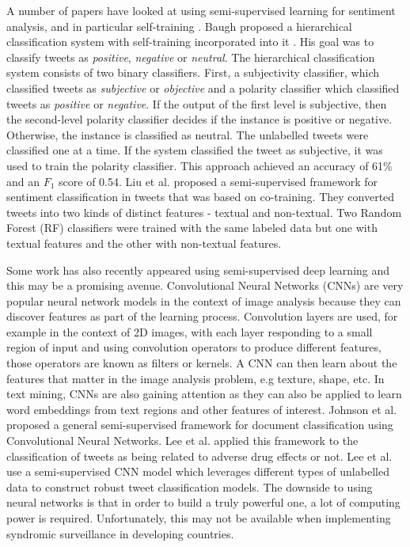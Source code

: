 \documentclass[10pt,letterpaper]{article}
\begin{document}
A number of papers have looked at using semi-supervised learning for sentiment analysis, and in particular self-training \cite{REF69, REF70}. Baugh \cite{REF71} proposed a hierarchical classification system with self-training incorporated into it . His goal was to classify tweets as \textit{positive}, \textit{negative} or \textit{neutral}. The hierarchical classification system consists of two binary classifiers. First, a subjectivity classifier, which classified tweets as \textit{subjective} or \textit{objective} and a polarity classifier which classified tweets as \textit{positive} or \textit{negative}. If the output of the first level is subjective, then the second-level polarity classifier decides if the instance is positive or negative. Otherwise, the instance is classified as neutral. The unlabelled tweets were classified one at a time. If the system classified the tweet as subjective, it was used to train the polarity classifier. This approach achieved an accuracy of 61\% and an $F_1$ score of 0.54. Liu et al.  \cite{REF72}  proposed a semi-supervised framework for sentiment classification in tweets that was based on co-training. They converted tweets into two kinds of distinct features - textual and non-textual. Two Random Forest (RF) classifiers were trained with the same labeled data but one with textual features and the other with non-textual features. 

Some work has also recently appeared using semi-supervised deep learning and this may be a promising avenue.  Convolutional Neural Networks (CNNs) \cite{REF84} are very popular neural network models in the context of image analysis because they can discover features as part of the learning process.  Convolution layers are used, for example in the context of 2D images, with each layer responding to a small region of input and using convolution operators to produce different features, those operators are known as filters or kernels. A CNN can then learn about the features that matter in the image analysis problem, e.g texture, shape, etc. In text mining, CNNs are also gaining attention as they can also be applied to learn word embeddings from text regions and other features of interest.  Johnson et al. \cite{REF76} proposed a general semi-supervised framework for document classification using Convolutional Neural Networks. Lee et al.  \cite{REF77} applied this framework to the classification of tweets as being related to adverse drug effects or not. Lee et al. use a semi-supervised CNN model which leverages different types of unlabelled data to construct robust tweet classification models. The downside to using neural networks is that in order to build a truly powerful one, a lot of computing power is required. Unfortunately, this may not be available when implementing syndromic surveillance in developing countries. 
\end{document}
